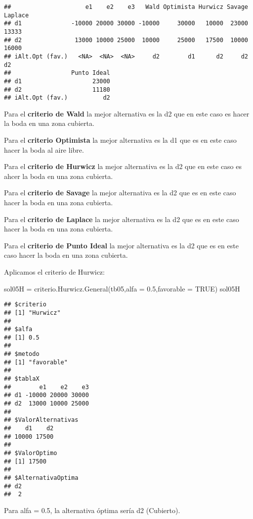 \documentclass[
]{article}
\newenvironment{Shaded}{\begin{snugshade}}{\end{snugshade}}
\newcommand{\AttributeTok}[1]{\textcolor[rgb]{0.77,0.63,0.00}{#1}}
\newcommand{\ConstantTok}[1]{\textcolor[rgb]{0.00,0.00,0.00}{#1}}
\newcommand{\FloatTok}[1]{\textcolor[rgb]{0.00,0.00,0.81}{#1}}
\newcommand{\FunctionTok}[1]{\textcolor[rgb]{0.00,0.00,0.00}{#1}}
\newcommand{\NormalTok}[1]{#1}
\newcommand{\OtherTok}[1]{\textcolor[rgb]{0.56,0.35,0.01}{#1}}
\begin{document}
\begin{verbatim}
##                     e1    e2    e3   Wald Optimista Hurwicz Savage Laplace
## d1              -10000 20000 30000 -10000     30000   10000  23000   13333
## d2               13000 10000 25000  10000     25000   17500  10000   16000
## iAlt.Opt (fav.)   <NA>  <NA>  <NA>     d2        d1      d2     d2      d2
##                 Punto Ideal
## d1                    23000
## d2                    11180
## iAlt.Opt (fav.)          d2
\end{verbatim}

Para el \textbf{criterio de Wald} la mejor alternativa es la d2 que en
este caso es hacer la boda en una zona cubierta.

Para el \textbf{criterio Optimista} la mejor alternativa es la d1 que es
en este caso hacer la boda al aire libre.

Para el \textbf{criterio de Hurwicz} la mejor alternativa es la d2 que
en este caso es ahcer la boda en una zona cubierta.

Para el \textbf{criterio de Savage} la mejor alternativa es la d2 que es
en este caso hacer la boda en una zona cubierta.

Para el \textbf{criterio de Laplace} la mejor alternativa es la d2 que
es en este caso hacer la boda en una zona cubierta.

Para el \textbf{criterio de Punto Ideal } la mejor alternativa es la d2
que es en este caso hacer la boda en una zona cubierta.

Aplicamos el criterio de Hurwicz:

\begin{Shaded}
\begin{Highlighting}[]
\NormalTok{sol05H }\OtherTok{=} \FunctionTok{criterio.Hurwicz.General}\NormalTok{(tb05,}\AttributeTok{alfa =} \FloatTok{0.5}\NormalTok{,}\AttributeTok{favorable =} \ConstantTok{TRUE}\NormalTok{)}
\NormalTok{sol05H}
\end{Highlighting}
\end{Shaded}

\begin{verbatim}
## $criterio
## [1] "Hurwicz"
## 
## $alfa
## [1] 0.5
## 
## $metodo
## [1] "favorable"
## 
## $tablaX
##        e1    e2    e3
## d1 -10000 20000 30000
## d2  13000 10000 25000
## 
## $ValorAlternativas
##    d1    d2 
## 10000 17500 
## 
## $ValorOptimo
## [1] 17500
## 
## $AlternativaOptima
## d2 
##  2
\end{verbatim}

Para alfa = 0.5, la alternativa óptima sería d2 (Cubierto).
\end{document}
